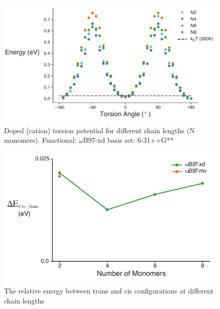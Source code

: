 \begin{figure}[hbt!]
    \centering
    \includegraphics{figures/append_tor_model/SI_cat_diff_lens.pdf}
    \caption{Doped (cation) torsion potential for different chain lengths (N monomers). Functional: $\omega$B97-xd basis set: 6-31++G** }
    \label{fig:cat_dl}
\end{figure}

\begin{figure}[hbt!]
    \centering
    \includegraphics{figures/append_tor_model/delta_e_plot.pdf}
    \caption{The relative energy between trans and cis configurations at different chain lengths}
    \label{fig:delta_e}
\end{figure}


